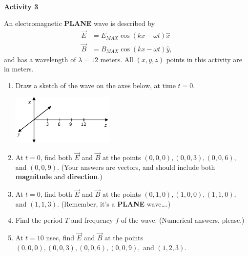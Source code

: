 \textbf{Activity 3}

An electromagnetic \textbf{PLANE} wave is described by
\begin{align*}
\vec E &= E_{MAX} \cos \left ( kx - \omega t \right ) \hat x\\
\vec B &= B_{MAX} \cos \left ( kx - \omega t \right ) \hat y,
\end{align*}
and has a wavelength of $\lambda =12$ meters.  All $(x,y,z)$ points in this activity are in meters.
\vspace{0.1in}

\begin{enumerate}

\item Draw a sketch of the wave on the axes below, at time $t=0$.
\begin{center}
\includegraphics[width=0.4\textwidth]{plane_waves/em_waves_axes.eps}
\end{center}

\item At $t=0$, find both $\vec E$ and $\vec B$ at the points $(0,0,0), (0,0,3), (0,0,6),$ and $(0,0,9)$.  (Your answers are vectors, and should include both \textbf{magnitude} and \textbf{direction}.) 
\vspace{1.0in}

\item At $t=0$, find both $\vec E$ and $\vec B$ at the points $(0,1,0), (1,0,0), (1,1,0),$ and $(1,1,3)$.  (Remember, it's a \textbf{PLANE} wave….)
\vspace{1.0in}

\item Find the period $T$ and frequency $f$ of the wave.  (Numerical answers, please.)
\vspace{1.0in}

\item At $t=10$ nsec, find $\vec E$ and $\vec B$ at the points $(0,0,0), (0,0,3), (0,0,6), (0,0,9),$ and $(1,2,3)$.  
\vspace{1.0in}
\end{enumerate}


